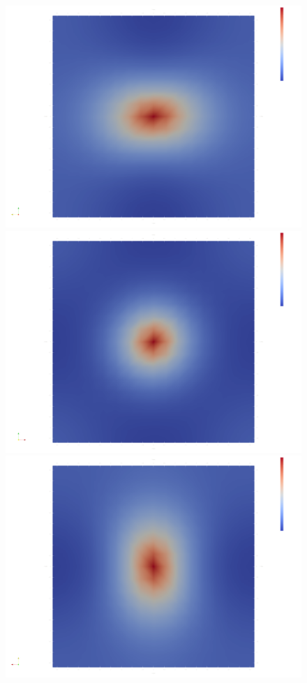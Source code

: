 \begin{figure}[!h]
{         
        {\includegraphics[width=0.32\linewidth]{images/kriging/3components/exact_cov_22_xx.png}}
        \hfill
        {\includegraphics[width=0.32\linewidth]{images/kriging/3components/exact_cov_22_yy.png}}
        \hfill
        {\includegraphics[width=0.32\linewidth]{images/kriging/3components/exact_cov_22_zz.png}}
        \hfill
        
}
\end{figure}
